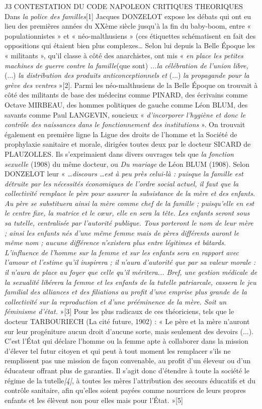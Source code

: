 J3 CONTESTATION DU CODE NAPOLEON
CRITIQUES THEORIQUES
 Dans \emph{la police des familles}[1] Jacques DONZELOT expose les débats qui ont eu lieu des premières années du XXème siècle jusqu'à la fin du baby-boom, entre « populationnistes » et « néo-malthusiens » (ces étiquettes schématisent en fait des oppositions qui étaient bien plus complexes… Selon lui depuis la Belle Époque les « militants », qu'il classe à côté des anarchistes, ont mis « \emph{en place les petites machines de guerre contre la famille}(que sont)\emph{ ...la célébration de l'union libre,} (...) \emph{la distribution des produits anticonceptionnels et} (...) \emph{la propagande pour la grève des ventres} »[2]. Parmi les néo-malthusiens de la Belle Époque on trouvait à côté des militants de base des médecins comme PINARD, des écrivains comme Octave MIRBEAU, des hommes politiques de gauche comme Léon BLUM, des savants comme Paul LANGEVIN, soucieux « \emph{d'incorporer l'hygiène et donc le contrôle des naissances dans le fonctionnement des institutions} ». On trouvait également en première ligne la Ligue des droits de l'homme et la Société de prophylaxie sanitaire et morale, dirigées toutes deux par le docteur SICARD de PLAUZOLLES. Ils s'exprimaient dans divers ouvrages tels que \emph{la fonction sexuelle} (1908) du même docteur, ou \emph{Du mariage} de Léon BLUM (1908). 
 Selon DONZELOT leur « \emph{…discours …est à peu près celui-là : puisque la famille est détruite par les nécessités économiques de l'ordre social actuel, il faut que la collectivité remplace le père pour assurer la subsistance de la mère et des enfants. Au père se substituera ainsi la mère comme chef de la famille ; puisqu'elle en est le centre fixe, la matrice et le cœur, elle en sera la tête. Les enfants seront sous sa tutelle, centralisée par l'autorité publique. Tous porteront le nom de leur mère ; ainsi les enfants nés d'une même femme mais de pères différents auront le même nom ; aucune différence n'existera plus entre légitimes et bâtards. L'influence de l'homme sur la femme et sur les enfants sera en rapport avec l'amour et l'estime qu'il inspirera ; il n'aura d'autorité que par sa valeur morale : il n'aura de place au foyer que celle qu'il méritera... Bref, une gestion médicale de la sexualité libérera la femme et les enfants de la tutelle patriarcale, cassera le jeu familial des alliances et des filiations au profit d'une emprise plus grande de la collectivité sur la reproduction et d'une prééminence de la mère. Soit un féminisme d'état.} »[3]
 Pour les plus radicaux de ces théoriciens, tels que le docteur TARBOURIECH (La cité future, 1902) : « Le père et la mère n'auront sur leur progéniture aucun droit d'aucune sorte, mais seulement des devoirs (...). C'est l'État qui déclare l'homme ou la femme apte à collaborer dans la mission d'élever tel futur citoyen et qui peut à tout moment les remplacer s'ils ne remplissent pas une mission de façon convenable, au profit d'un éleveur ou d'un éducateur offrant plus de garanties. Il s'agit donc d'étendre à toute la société le régime de la tutelle\emph{[4]}, à toutes les mères l'attribution des secours éducatifs et du contrôle sanitaire, afin qu'elles soient payées comme nourrices de leurs propres enfants et les élèvent non pour elles mais pour l'État. »[5]
